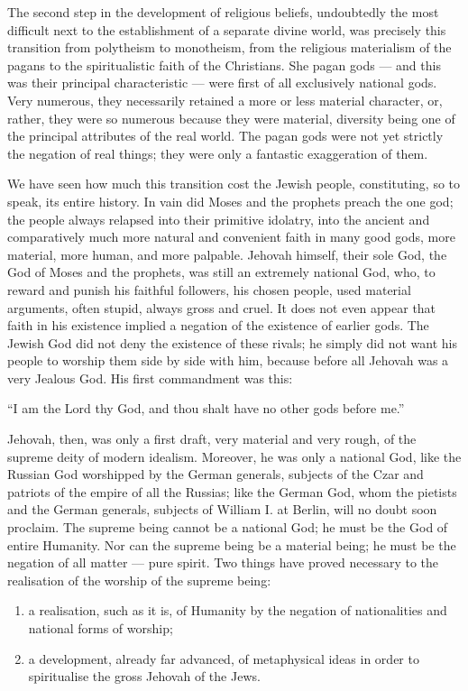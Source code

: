 \documentclass[12pt]{report}
\begin{document}
The second step in the development of religious beliefs, undoubtedly the most difficult next to the establishment of a separate divine world, was precisely this transition from polytheism to monotheism, from the religious materialism of the pagans to the spiritualistic faith of the Christians. She pagan gods — and this was their principal characteristic — were first of all exclusively national gods. Very numerous, they necessarily retained a more or less material character, or, rather, they were so numerous because they were material, diversity being one of the principal attributes of the real world. The pagan gods were not yet strictly the negation of real things; they were only a fantastic exaggeration of them.


We have seen how much this transition cost the Jewish people, constituting, so to speak, its entire history. In vain did Moses and the prophets preach the one god; the people always relapsed into their primitive idolatry, into the ancient and comparatively much more natural and convenient faith in many good gods, more material, more human, and more palpable. Jehovah himself, their sole God, the God of Moses and the prophets, was still an extremely national God, who, to reward and punish his faithful followers, his chosen people, used material arguments, often stupid, always gross and cruel. It does not even appear that faith in his existence implied a negation of the existence of earlier gods. The Jewish God did not deny the existence of these rivals; he simply did not want his people to worship them side by side with him, because before all Jehovah was a very Jealous God. His first commandment was this:


“I am the Lord thy God, and thou shalt have no other gods before me.”


Jehovah, then, was only a first draft, very material and very rough, of the supreme deity of modern idealism. Moreover, he was only a national God, like the Russian God worshipped by the German generals, subjects of the Czar and patriots of the empire of all the Russias; like the German God, whom the pietists and the German generals, subjects of William I. at Berlin, will no doubt soon proclaim. The supreme being cannot be a national God; he must be the God of entire Humanity. Nor can the supreme being be a material being; he must be the negation of all matter — pure spirit. Two things have proved necessary to the realisation of the worship of the supreme being:


\begin{enumerate}
\item
a realisation, such as it is, of Humanity by the negation of nationalities and national forms of worship;
\item
a development, already far advanced, of metaphysical ideas in order to spiritualise the gross Jehovah of the Jews.
\end{enumerate}
\end{document}
